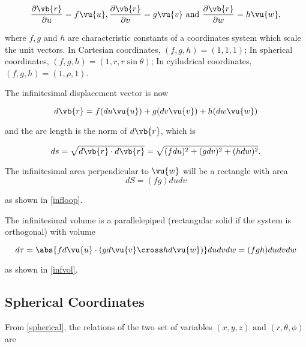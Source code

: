 \documentclass[english,a4paper,12pt]{report}
\begin{document}
\begin{equation}
    \frac{\partial \vb{r} }{\partial u} = f \vu{u}, \frac{\partial \vb{r} }{\partial v} = g \vu{v}  \text { and } \frac{\partial \vb{r} }{\partial w} = h \vu{w}  ,
\end{equation}

where \(f,g\) and \(h\) are characteristic constants of a coordinates system which scale the unit vectors. In Cartesian coordinates, \((f,g,h) = (1,1,1)\); In spherical coordinates, \((f,g,h) = (1,r,r\sin{\theta})\); In cyilndrical coordinates, \((f,g,h) = (1,\rho ,1)\).
	
The infinitesimal displacement vector is now 

\begin{equation}
    d \vb{r} = f(du\vu{u}) + g(dv\vu{v}) + h(dw\vu{w}) \label{dl} 
\end{equation}

and the arc length is the norm of \(d \vb{r} \), which is 

\begin{equation}
    ds = \sqrt{d \vb{r} \cdot d \vb{r} } = \sqrt{(fdu)^2 + (gdv)^2 + (hdw)^2}.  
\end{equation}



The infinitesimal area perpendicular to \(\vu{w}\) will be a rectangle with area
\begin{equation}
	dS = (fg)dudv \label{da}
\end{equation} 

as shown in \cref{infloop}.

	
The infinitesimal volume is a parallelepiped (rectangular solid if the system is orthogonal) with volume

\begin{equation}
    d \tau = \abs{fd \vu{u} \cdot (gd \vu{v} \cross hd \vu{w} )}dudvdw = (fgh)dudvdw 
\end{equation}

as shown in \cref{infvol}. 

	
\subsection{Spherical Coordinates}


From \cref{spherical}, the relations of the two set of variables \((x,y,z) \text { and } (r,\theta ,\phi  )\)  are
\end{document}
